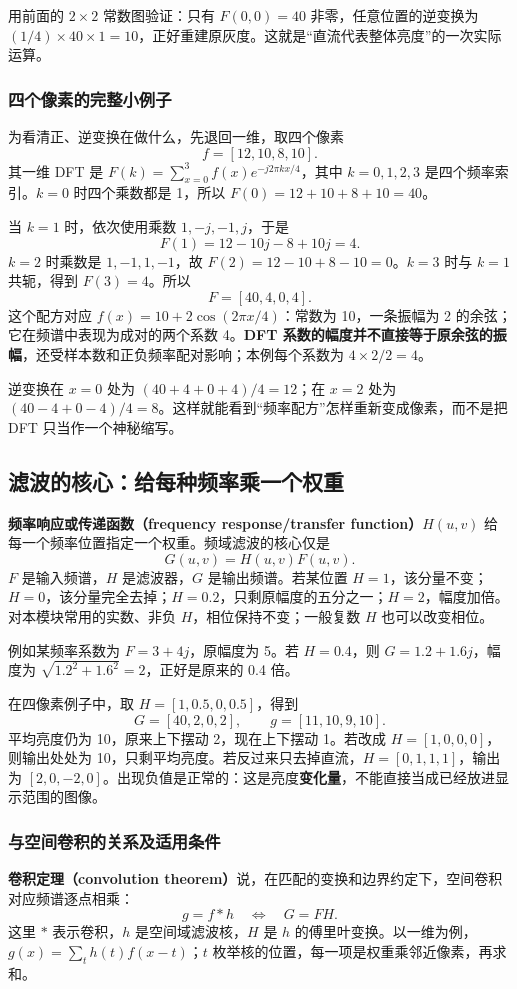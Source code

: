 用前面的 $2\times2$ 常数图验证：只有 $F(0,0)=40$ 非零，任意位置的逆变换为 $(1/4)\times40\times1=10$，正好重建原灰度。这就是“直流代表整体亮度”的一次实际运算。

\subsubsection{四个像素的完整小例子}
为看清正、逆变换在做什么，先退回一维，取四个像素
\[
f=[12,10,8,10].
\]
其一维 DFT 是 $F(k)=\sum_{x=0}^{3}f(x)e^{-j2\pi kx/4}$，其中 $k=0,1,2,3$ 是四个频率索引。$k=0$ 时四个乘数都是 1，所以 $F(0)=12+10+8+10=40$。

当 $k=1$ 时，依次使用乘数 $1,-j,-1,j$，于是
\[
F(1)=12-10j-8+10j=4.
\]
$k=2$ 时乘数是 $1,-1,1,-1$，故 $F(2)=12-10+8-10=0$。$k=3$ 时与 $k=1$ 共轭，得到 $F(3)=4$。所以
\[
F=[40,4,0,4].
\]
这个配方对应 $f(x)=10+2\cos(2\pi x/4)$：常数为 10，一条振幅为 2 的余弦；它在频谱中表现为成对的两个系数 4。\textbf{DFT 系数的幅度并不直接等于原余弦的振幅}，还受样本数和正负频率配对影响；本例每个系数为 $4\times2/2=4$。

逆变换在 $x=0$ 处为 $(40+4+0+4)/4=12$；在 $x=2$ 处为 $(40-4+0-4)/4=8$。这样就能看到“频率配方”怎样重新变成像素，而不是把 DFT 只当作一个神秘缩写。

\subsection{滤波的核心：给每种频率乘一个权重}

\textbf{频率响应或传递函数（frequency response/transfer function）}$H(u,v)$ 给每一个频率位置指定一个权重。频域滤波的核心仅是
\[
G(u,v)=H(u,v)F(u,v).
\]
$F$ 是输入频谱，$H$ 是滤波器，$G$ 是输出频谱。若某位置 $H=1$，该分量不变；$H=0$，该分量完全去掉；$H=0.2$，只剩原幅度的五分之一；$H=2$，幅度加倍。对本模块常用的实数、非负 $H$，相位保持不变；一般复数 $H$ 也可以改变相位。

例如某频率系数为 $F=3+4j$，原幅度为 5。若 $H=0.4$，则 $G=1.2+1.6j$，幅度为 $\sqrt{1.2^2+1.6^2}=2$，正好是原来的 0.4 倍。

在四像素例子中，取 $H=[1,0.5,0,0.5]$，得到
\[
G=[40,2,0,2],\qquad g=[11,10,9,10].
\]
平均亮度仍为 10，原来上下摆动 2，现在上下摆动 1。若改成 $H=[1,0,0,0]$，则输出处处为 10，只剩平均亮度。若反过来只去掉直流，$H=[0,1,1,1]$，输出为 $[2,0,-2,0]$。出现负值是正常的：这是亮度\textbf{变化量}，不能直接当成已经放进显示范围的图像。

\subsubsection{与空间卷积的关系及适用条件}
\textbf{卷积定理（convolution theorem）}说，在匹配的变换和边界约定下，空间卷积对应频谱逐点相乘：
\[
g=f*h\quad\Longleftrightarrow\quad G=FH.
\]
这里 $*$ 表示卷积，$h$ 是空间域滤波核，$H$ 是 $h$ 的傅里叶变换。以一维为例，$g(x)=\sum_t h(t)f(x-t)$；$t$ 枚举核的位置，每一项是权重乘邻近像素，再求和。

